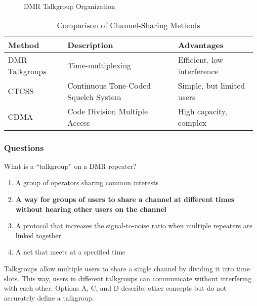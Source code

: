 \begin{figure}[h]
    \centering
    \caption{DMR Talkgroup Organization}
    \label{fig:dmr-talkgroups}
\end{figure}

\begin{table}[h]
    \centering
    \begin{tabular}{|l|l|l|}
        \hline
        \textbf{Method} & \textbf{Description} & \textbf{Advantages} \\
        \hline
        DMR Talkgroups & Time-multiplexing & Efficient, low interference \\
        CTCSS & Continuous Tone-Coded Squelch System & Simple, but limited users \\
        CDMA & Code Division Multiple Access & High capacity, complex \\
        \hline
    \end{tabular}
    \caption{Comparison of Channel-Sharing Methods}
    \label{tab:channel-sharing-comparison}
\end{table}

\subsubsection*{Questions}

\begin{tcolorbox}[colback=gray!10!white,colframe=black!75!black,title={T8D02}]
    What is a “talkgroup” on a DMR repeater?
    \begin{enumerate}[label=\Alph*),noitemsep]
        \item A group of operators sharing common interests
        \item \textbf{A way for groups of users to share a channel at different times without hearing other users on the channel}
        \item A protocol that increases the signal-to-noise ratio when multiple repeaters are linked together
        \item A net that meets at a specified time
    \end{enumerate}
\end{tcolorbox}

Talkgroups allow multiple users to share a single channel by dividing it into time slots. This way, users in different talkgroups can communicate without interfering with each other. Options A, C, and D describe other concepts but do not accurately define a talkgroup.

